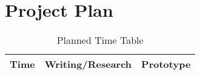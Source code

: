 \section{Project Plan}
\label{sec:plan}


\begin{table}[h!]
    \centering
    \begin{tabular}{ | c | m{} | m{} | }
        \hline
        \textbf{Time} & \textbf{Writing/Research} & \textbf{Prototype} \\
        \hline
        \hline
    \end{tabular}
    \caption{Planned Time Table}
    \label{tab:time-table}
\end{table}
